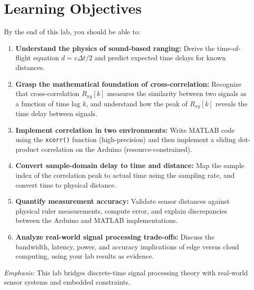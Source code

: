 \documentclass[11pt,letterpaper]{article}
\begin{document}
\clearpage

\section{Learning Objectives}

By the end of this lab, you should be able to:

\begin{enumerate}
    \item \textbf{Understand the physics of sound-based ranging:} Derive the time-of-flight equation $d = v \Delta t / 2$ and predict expected time delays for known distances.

    \item \textbf{Grasp the mathematical foundation of cross-correlation:} Recognize that cross-correlation $R_{xy}[k]$ measures the similarity between two signals as a function of time lag $k$, and understand how the peak of $R_{xy}[k]$ reveals the time delay between signals.

    \item \textbf{Implement correlation in two environments:} Write MATLAB code using the \texttt{xcorr()} function (high-precision) and then implement a sliding dot-product correlation on the Arduino (resource-constrained).

    \item \textbf{Convert sample-domain delay to time and distance:} Map the sample index of the correlation peak to actual time using the sampling rate, and convert time to physical distance.

    \item \textbf{Quantify measurement accuracy:} Validate sensor distances against physical ruler measurements, compute error, and explain discrepancies between the Arduino and MATLAB implementations.

    \item \textbf{Analyze real-world signal processing trade-offs:} Discuss the bandwidth, latency, power, and accuracy implications of edge versus cloud computing, using your lab results as evidence.
\end{enumerate}

\noindent
\textit{Emphasis:} This lab bridges discrete-time signal processing theory with real-world sensor systems and embedded constraints.

\clearpage
\end{document}
